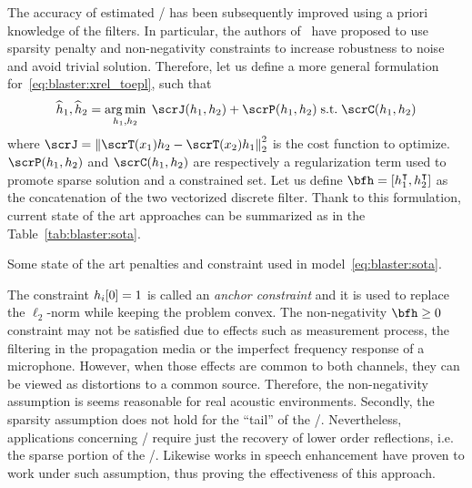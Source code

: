 \mynewline
The accuracy of estimated \RIRs/ has been subsequently improved using a priori knowledge of the filters.
In particular, the authors of~ have proposed to use sparsity penalty and non-negativity constraints to increase robustness to noise and avoid trivial solution.
Therefore, let us define a more general formulation for~\cref{eq:blaster:xrel_toepl}, such that
\begin{equation}\label{eq:blaster:sota}
    \disFilterHat_1, \disFilterHat_2
    =
    \kargmin_{\disFilter_1, \disFilter_2}
    \;
    \scrJ(\disFilter_1, \disFilter_2) + \scrP(\disFilter_1, \disFilter_2)
    \;\text{s.t.}\;
    \scrC(\disFilter_1, \disFilter_2)
\end{equation}
where $\scrJ = \kvvbar{\scrT(\disRecordedSignal_1) \disFilter_2 - \scrT(\disRecordedSignal_2) \disFilter_1}_2^2$ is the cost function to optimize.
$\scrP(\disFilter_1, \disFilter_2)$ and $\scrC(\disFilter_1, \disFilter_2)$ are respectively a regularization term used to promote sparse solution and a constrained set.
Let us define $\bfh = \klist{h_1^\intercal, h_2^\intercal}$ as the concatenation of the two vectorized discrete filter.
Thank to this formulation, current state of the art approaches can be summarized as in the Table~\cref{tab:blaster:sota}.

\begin{table}[!h]

    \begin{fullwidth}
        \centering
        \small
        

        \caption{Some state of the art penalties and constraint used in model~\cref{eq:blaster:sota}.}
        \label{tab:blaster:sota}
    \end{fullwidth}
\end{table}

\noindent The constraint $h_i[0]=1$ is called an \textit{anchor constraint} and it is used to replace the $\ell_2$-norm while keeping the problem convex.
The non-negativity $\bfh \geq 0$ constraint may not be satisfied due to effects such as measurement process, the filtering in the propagation media or the imperfect frequency response of a microphone.
However, when those effects are common to both channels, they can be viewed as distortions to a common source.
Therefore, the non-negativity assumption is seems reasonable for real acoustic environments.
Secondly, the sparsity assumption does not hold for the ``tail'' of the \RIR/.
Nevertheless, applications concerning \RooGE/ require just the recovery of lower order reflections, i.e. the sparse portion of the \RIR/.
Likewise works in speech enhancement have proven to work under such assumption, thus proving the effectiveness of this approach.


